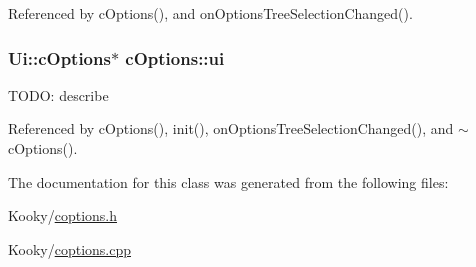 Referenced by c\+Options(), and on\+Options\+Tree\+Selection\+Changed().

\subsubsection[{\texorpdfstring{ui}{ui}}]{\setlength{\rightskip}{0pt plus 5cm}Ui\+::c\+Options$\ast$ c\+Options\+::ui\hspace{0.3cm}{\ttfamily [private]}}\hypertarget{classc_options_a60bdd139c27b5a5e77c018ff41880995}{}\label{classc_options_a60bdd139c27b5a5e77c018ff41880995}
T\+O\+DO\+: describe 

Referenced by c\+Options(), init(), on\+Options\+Tree\+Selection\+Changed(), and $\sim$c\+Options().



The documentation for this class was generated from the following files\+:\begin{DoxyCompactItemize}
\item 
Kooky/\hyperlink{coptions_8h}{coptions.\+h}\item 
Kooky/\hyperlink{coptions_8cpp}{coptions.\+cpp}\end{DoxyCompactItemize}

